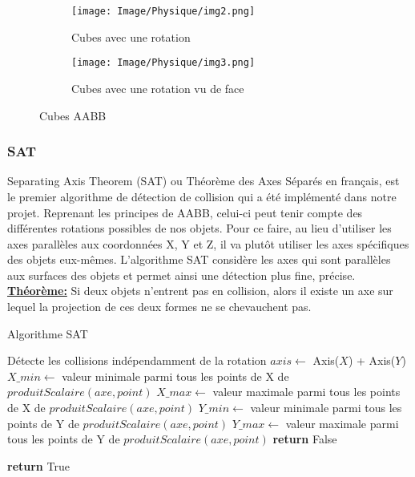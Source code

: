 \begin{figure}[h!]
	\begin{subfigure}{0.4\linewidth} 
		\texttt{[image: Image/Physique/img2.png]}
		\caption{Cubes avec une rotation}
		\label{fig:Cubes avec une rotation}
	\end{subfigure}
	\begin{subfigure}{0.4\linewidth}
		\texttt{[image: Image/Physique/img3.png]}
		\caption{Cubes avec une rotation vu de face}
		\label{fig:Cubes avec une rotation vu de face}
	\end{subfigure}
	\caption{Cubes AABB}
	\label{fig:Cubes AABB}
\end{figure}


\pagebreak

\subsubsection{SAT}
Separating Axis Theorem (SAT) ou Théorème des Axes Séparés en français, est le premier algorithme de détection de collision qui a été implémenté dans notre projet. Reprenant les principes de AABB, celui-ci peut tenir compte des différentes rotations possibles de nos objets. Pour ce faire, au lieu d'utiliser les axes parallèles aux coordonnées X, Y et Z, il va plutôt utiliser les axes spécifiques des objets eux-mêmes. L'algorithme SAT considère les axes qui sont parallèles aux surfaces des objets et permet ainsi une détection plus fine, précise.\\

\underline{\textbf{Théorème:}} Si deux objets n'entrent pas en collision, alors il existe un axe sur lequel la projection de ces deux formes ne se chevauchent pas.

\begin{algorithm}[H]
	\caption{Algorithme SAT}
	\label{Algorithm_Projections}
	\begin{algorithmic}[1]
		\Ensure Détecte les collisions indépendamment de la rotation	
		\State $axis \gets$ Axis($X$) + Axis($Y$)
		\State $X\_min \gets$ valeur minimale parmi tous les points de X de $produitScalaire(axe, point)$
		\State $X\_max \gets$ valeur maximale parmi tous les points de X de $produitScalaire(axe, point)$
		\State $Y\_min \gets$ valeur minimale parmi tous les points de Y de $produitScalaire(axe, point)$
		\State $Y\_max \gets$ valeur maximale parmi tous les points de Y de $produitScalaire(axe, point)$
		\State \textbf{return} False
		\EndIf
		
		\EndFor
		
		\State \textbf{return} True
	\end{algorithmic}
\end{algorithm}
\pagebreak

